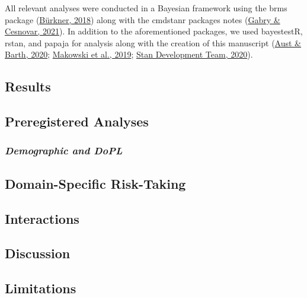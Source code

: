 \documentclass[
  donotrepeattitle,doc, 12pt, a4paper,floatsintext]{apa7}
\begin{document}
All relevant analyses were conducted in a Bayesian framework using the brms package (\protect\hyperlink{ref-burkner2018}{Bürkner, 2018}) along with the cmdstanr packages notes (\protect\hyperlink{ref-gabry2021}{Gabry \& Cesnovar, 2021}). In addition to the aforementioned packages, we used bayestestR, rstan, and papaja for analysis along with the creation of this manuscript (\protect\hyperlink{ref-aust2020}{Aust \& Barth, 2020}; \protect\hyperlink{ref-makowski2019}{Makowski et al., 2019}; \protect\hyperlink{ref-standevelopmentteam2020}{Stan Development Team, 2020}).

\hypertarget{results}{%
\subsection{Results}\label{results}}

\hypertarget{preregistered-analyses}{%
\subsection{Preregistered Analyses}\label{preregistered-analyses}}

\hypertarget{demographic-and-dopl}{%
\subsubsection{\texorpdfstring{\emph{Demographic and DoPL}}{Demographic and DoPL}}\label{demographic-and-dopl}}

\hypertarget{domain-specific-risk-taking}{%
\subsection{Domain-Specific Risk-Taking}\label{domain-specific-risk-taking}}

\hypertarget{interactions}{%
\subsection{Interactions}\label{interactions}}

\hypertarget{discussion}{%
\subsection{Discussion}\label{discussion}}

\hypertarget{limitations}{%
\subsection{Limitations}\label{limitations}}
\end{document}

